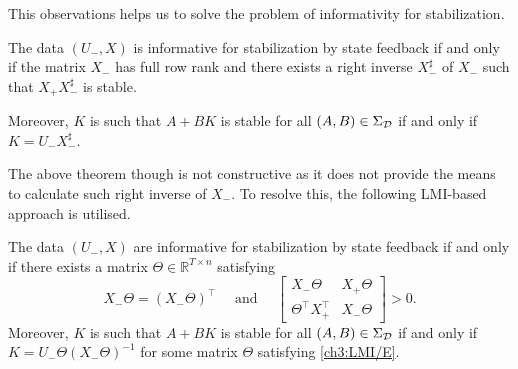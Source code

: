 This observations helps us to solve the problem of informativity for stabilization.
\begin{theorem}
	\label{ch3:t:algstab}
	The data $(U_-,X)$ is informative for stabilization by state feedback if and only if the matrix $X_-$ has full row rank and there exists a right inverse $X_-^\sharp$ of $X_-$ such that $X_+ X_-^\sharp$ is stable. 
	
	Moreover, $K$ is such that $A +BK$ is stable for all $(A,B) \in \Sigma_{\mathcal{D}}$ if and only if $K = U_- X_-^\sharp$.
\end{theorem}
The above theorem though is not constructive as it does not provide the means to calculate such right inverse of $X_-$. To resolve this, the following LMI-based approach is utilised.
\begin{theorem}\label{ch3:t:lmistab}
	The data $(U_-,X)$ are informative for stabilization by state feedback if and only if there exists a matrix $\Theta \in \mathbb{R}^{T \times n}$ satisfying
	\begin{equation}
		\label{ch3:LMI/E}
		X_- \Theta = (X_- \Theta)^\top\quad\text{ and }\quad
		\begin{bmatrix}
			X_- \Theta & X_+ \Theta \\ \Theta^\top X_+^\top & X_- \Theta
		\end{bmatrix} > 0.
	\end{equation}
	Moreover, $K$ is such that $A +BK$ is stable for all $(A,B) \in \Sigma_{\mathcal{D}}$ if and only if $K = U_- \Theta (X_-\Theta)^{-1}$ for some matrix $\Theta$ satisfying \eqref{ch3:LMI/E}.
\end{theorem}
